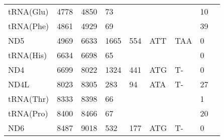 \documentclass[../DISSERTACAO_MAIN.tex]{subfiles}
\begin{document}
\begin{longtable}{llllllllllllllllllllll}
			tRNA(Glu)    & \multicolumn{2}{l}{4778}    & \multicolumn{2}{l}{4850}    & \multicolumn{2}{l}{73}          & \multicolumn{3}{l}{}                          & \multicolumn{3}{l}{}      & \multicolumn{3}{l}{}        & \multicolumn{3}{l}{10}          & \multicolumn{3}{l}{}         \\
			tRNA(Phe)    & \multicolumn{2}{l}{4861}    & \multicolumn{2}{l}{4929}    & \multicolumn{2}{l}{69}          & \multicolumn{3}{l}{}                          & \multicolumn{3}{l}{}      & \multicolumn{3}{l}{}        & \multicolumn{3}{l}{39}          & \multicolumn{3}{l}{}         \\
			ND5          & \multicolumn{2}{l}{4969}    & \multicolumn{2}{l}{6633}    & \multicolumn{2}{l}{1665}        & \multicolumn{3}{l}{554}                       & \multicolumn{3}{l}{ATT}   & \multicolumn{3}{l}{TAA}     & \multicolumn{3}{l}{0}           & \multicolumn{3}{l}{}         \\
			tRNA(His)    & \multicolumn{2}{l}{6634}    & \multicolumn{2}{l}{6698}    & \multicolumn{2}{l}{65}          & \multicolumn{3}{l}{}                          & \multicolumn{3}{l}{}      & \multicolumn{3}{l}{}        & \multicolumn{3}{l}{0}           & \multicolumn{3}{l}{}         \\
			ND4          & \multicolumn{2}{l}{6699}    & \multicolumn{2}{l}{8022}    & \multicolumn{2}{l}{1324}        & \multicolumn{3}{l}{441}                       & \multicolumn{3}{l}{ATG}   & \multicolumn{3}{l}{T-}      & \multicolumn{3}{l}{0}           & \multicolumn{3}{l}{}         \\
			ND4L         & \multicolumn{2}{l}{8023}    & \multicolumn{2}{l}{8305}    & \multicolumn{2}{l}{283}         & \multicolumn{3}{l}{94}                        & \multicolumn{3}{l}{ATA}   & \multicolumn{3}{l}{T-}      & \multicolumn{3}{l}{27}          & \multicolumn{3}{l}{}         \\
			tRNA(Thr)    & \multicolumn{2}{l}{8333}    & \multicolumn{2}{l}{8398}    & \multicolumn{2}{l}{66}          & \multicolumn{3}{l}{}                          & \multicolumn{3}{l}{}      & \multicolumn{3}{l}{}        & \multicolumn{3}{l}{1}           & \multicolumn{3}{l}{}         \\
			tRNA(Pro)    & \multicolumn{2}{l}{8400}    & \multicolumn{2}{l}{8466}    & \multicolumn{2}{l}{67}          & \multicolumn{3}{l}{}                          & \multicolumn{3}{l}{}      & \multicolumn{3}{l}{}        & \multicolumn{3}{l}{20}          & \multicolumn{3}{l}{}         \\
			ND6          & \multicolumn{2}{l}{8487}    & \multicolumn{2}{l}{9018}    & \multicolumn{2}{l}{532}         & \multicolumn{3}{l}{177}                       & \multicolumn{3}{l}{ATG}   & \multicolumn{3}{l}{T-}      & \multicolumn{3}{l}{0}           & \multicolumn{3}{l}{}         \\

\end{longtable}
\end{document}

